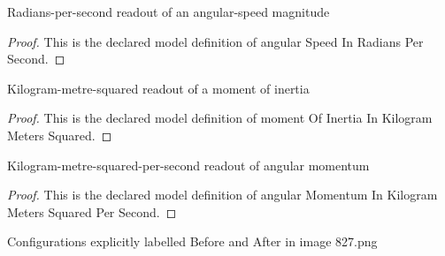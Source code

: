 \begin{definition}
  \label{def:physics:phyx-mini-0827:phyxminiproblems-problemphyxmini0827-angularspeedinradianspersecond}
  Radians-per-second readout of an angular-speed magnitude
\end{definition}
\begin{proof}
  This is the declared model definition of angular Speed In Radians Per Second.
\end{proof}
\begin{definition}
  \label{def:physics:phyx-mini-0827:phyxminiproblems-problemphyxmini0827-momentofinertiainkilogrammeterssquared}
  Kilogram-metre-squared readout of a moment of inertia
\end{definition}
\begin{proof}
  This is the declared model definition of moment Of Inertia In Kilogram Meters Squared.
\end{proof}
\begin{definition}
  \label{def:physics:phyx-mini-0827:phyxminiproblems-problemphyxmini0827-angularmomentuminkilogrammeterssquaredpersecond}
  Kilogram-metre-squared-per-second readout of angular momentum
\end{definition}
\begin{proof}
  This is the declared model definition of angular Momentum In Kilogram Meters Squared Per Second.
\end{proof}
\begin{definition}
  \label{def:physics:phyx-mini-0827:phyxminiproblems-problemphyxmini0827-collisionstage}
  Configurations explicitly labelled Before and After in image 827.png
\end{definition}
